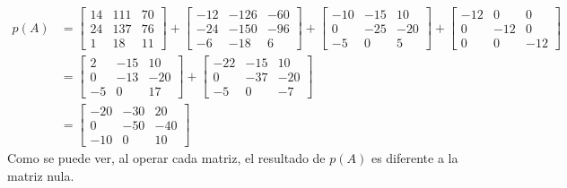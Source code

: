     \[
        \begin{aligned}
            p(A) &=
            \begin{bmatrix}
                14 & 111 & 70 \\
                24 & 137 & 76 \\
                1 & 18 & 11
            \end{bmatrix}
            +
            \begin{bmatrix}
                -12 & -126 & -60 \\ 
                -24 & -150 & -96 \\
                -6 & -18 & 6
            \end{bmatrix}
            +
            \begin{bmatrix}
                -10 & -15 & 10 \\ 
                0 & -25 & -20 \\ 
                -5 & 0 & 5
            \end{bmatrix}
            +
            \begin{bmatrix}
                -12 & 0 & 0 \\
                0 & -12 & 0 \\
                0 & 0 & -12
            \end{bmatrix} 
            \\
            &=
            \begin{bmatrix}
                2 & -15 & 10 \\
                0 & -13 & -20 \\
                -5 & 0 & 17
            \end{bmatrix}
            +
            \begin{bmatrix}
                -22 & -15 & 10 \\ 
                0 & -37 & -20 \\ 
                -5 & 0 & -7
            \end{bmatrix}
            \\
            &=
            \begin{bmatrix}
                -20 & -30 & 20 \\
                0 & -50 & -40 \\
                -10 & 0 & 10
            \end{bmatrix}
        \end{aligned}
    \]
    Como se puede ver, al operar cada matriz, el resultado de \(p(A)\) es diferente a la matriz nula.
    

